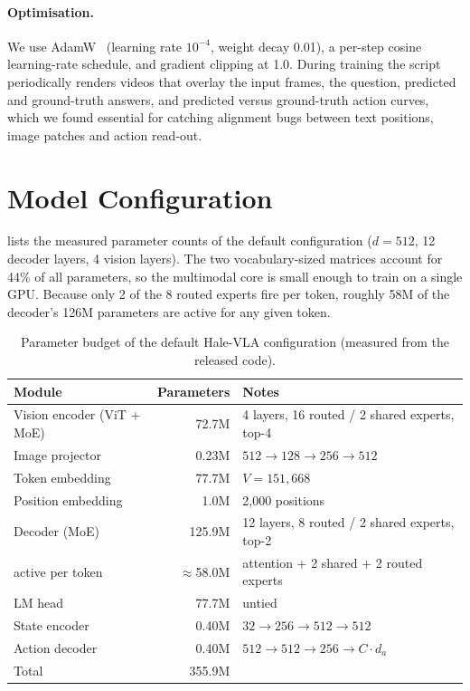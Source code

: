 \documentclass[11pt]{article}
\begin{document}
\paragraph{Optimisation.} We use AdamW~\cite{loshchilov2019adamw} (learning rate
$10^{-4}$, weight decay 0.01), a per-step cosine learning-rate schedule, and gradient
clipping at 1.0. During training the script periodically renders videos that overlay the
input frames, the question, predicted and ground-truth answers, and predicted versus
ground-truth action curves, which we found essential for catching alignment bugs between
text positions, image patches and action read-out.

\section{Model Configuration}

 lists the measured parameter counts of the default configuration
($d=512$, 12 decoder layers, 4 vision layers). The two vocabulary-sized matrices account for
44\% of all parameters, so the multimodal core is small enough to train on a single GPU.
Because only 2 of the 8 routed experts fire per token, roughly 58M of the decoder's 126M
parameters are active for any given token.

\begin{table}[t]
\centering
\caption{Parameter budget of the default Hale-VLA configuration (measured from the released code).}
\label{tab:params}
\begin{tabular}{lrl}
\toprule
Module & Parameters & Notes \\
\midrule
Vision encoder (ViT + MoE) & 72.7M & 4 layers, 16 routed / 2 shared experts, top-4 \\
Image projector & 0.23M & $512\to128\to256\to512$ \\
Token embedding & 77.7M & $V=151{,}668$ \\
Position embedding & 1.0M & 2{,}000 positions \\
Decoder (MoE) & 125.9M & 12 layers, 8 routed / 2 shared experts, top-2 \\
\quad active per token & $\approx$58.0M & attention + 2 shared + 2 routed experts \\
LM head & 77.7M & untied \\
State encoder & 0.40M & $32\to256\to512\to512$ \\
Action decoder & 0.40M & $512\to512\to256\to C\cdot d_a$ \\
\midrule
Total & 355.9M & \\
\bottomrule
\end{tabular}
\end{table}
\end{document}
